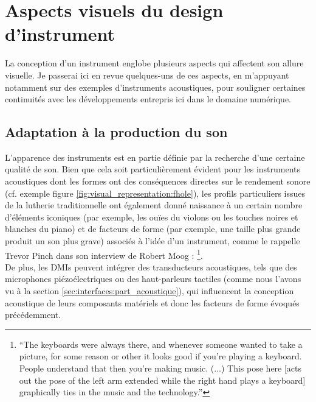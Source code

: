 \clearpage

\section{Aspects visuels du design d'instrument}

\noindent La conception d'un instrument englobe plusieurs aspects qui affectent son allure visuelle. Je passerai ici en revue quelques-uns de ces aspects, en m'appuyant notamment sur des exemples d'instruments acoustiques, pour souligner certaines continuités avec les développements entrepris ici dans le domaine numérique.

\subsection{Adaptation à la production du son}


\noindent L'apparence des instruments est en partie définie par la recherche d'une certaine qualité de son. Bien que cela soit particulièrement évident pour les instruments acoustiques dont les formes ont des conséquences directes sur le rendement sonore (cf. exemple figure \ref{fig:visual_representation:fhole}), les profils particuliers issues de la lutherie traditionnelle ont également donné naissance à un certain nombre d'éléments iconiques (par exemple, les ouïes du violons ou les touches noires et blanches du piano) et de facteurs de forme (par exemple, une taille plus grande produit un son plus grave) associés à l'idée d'un instrument, comme le rappelle Trevor Pinch dans son interview de Robert Moog \cite{pinch_why_2001}: \footnote{``The keyboards were always there, and whenever someone wanted to take a picture, for some reason or other it looks good if you’re playing a keyboard. People understand that then you’re making music. (...) This pose here [acts out the pose of the left arm extended while the right hand plays a keyboard] graphically ties in the music and the technology.''}.\\
\indent De plus, les \glspl{DMI} peuvent intégrer des transducteurs acoustiques, tels que des microphones piézoélectriques ou des haut-parleurs tactiles (comme nous l'avons vu à la section \ref{sec:interfaces:part_acoustique}), qui influencent la conception acoustique de leurs composants matériels et donc les facteurs de forme évoqués précédemment.

